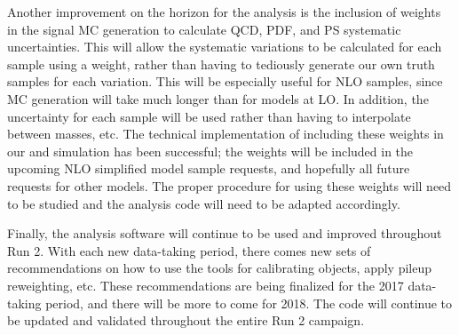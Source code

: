 Another improvement on the horizon for the analysis is the inclusion of weights in the signal MC generation to calculate QCD, PDF, and PS systematic uncertainties. This will allow the systematic variations to be calculated for each sample using a weight, rather than having to tediously generate our own truth samples for each variation. This will be especially useful for NLO samples, since MC generation will take much longer than for models at LO. In addition, the uncertainty for each sample will be used rather than having to interpolate between masses, etc. The technical implementation of including these weights in our \madgraph and \pythia simulation has been successful; the weights will be included in the upcoming NLO simplified model sample requests, and hopefully all future requests for other models. The proper procedure for using these weights will need to be studied and the analysis code will need to be adapted accordingly.

Finally, the \monoZ analysis software will continue to be used and improved throughout Run 2. With each new data-taking period, there comes new sets of recommendations on how to use the tools for calibrating objects, apply pileup reweighting, etc.
These recommendations are being finalized for the 2017 data-taking period, and there will be more to come for 2018. The code will continue to be updated and validated throughout the entire Run 2 campaign.

